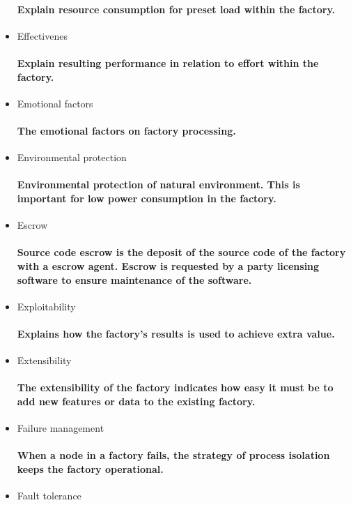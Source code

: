 \documentclass{acm_proc_article-sp}
\begin{document}
\begin{itemize}
\paragraph{Explain resource consumption for preset load within the factory.}
\item Effectivenes
\paragraph{Explain resulting performance in relation to effort within the factory.}
\item Emotional factors
\paragraph{The emotional factors on factory processing.}
\item Environmental protection
\paragraph{Environmental protection of natural environment. This is important for low power consumption in the factory.}
\item Escrow
\paragraph{Source code escrow is the deposit of the source code of the factory with a escrow agent. Escrow is requested by a party licensing software to ensure maintenance of the software.}
\item Exploitability
\paragraph{Explains how the factory's results is used to achieve extra value.}
\item Extensibility
\paragraph{The extensibility of the factory indicates how easy it must be to add new features or data to the existing factory.}
\item Failure management
\paragraph{When a node in a factory fails, the strategy of process isolation keeps the factory operational.}
\item Fault tolerance 

\end{itemize}
\end{document}
